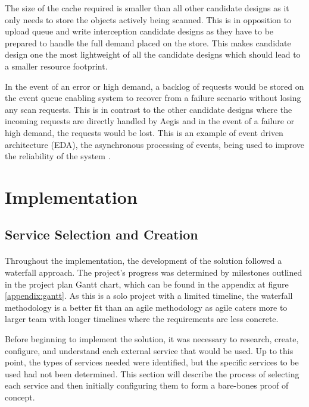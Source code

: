 \documentclass[12pt, conference, final, a4paper, onecolumn, compsoc]{IEEEtran}
\begin{document}
The size of the cache required is smaller than all other candidate designs as it
only needs to store the objects actively being scanned. This is in opposition to
upload queue and write interception candidate designs as they have to be
prepared to handle the full demand placed on the store. This makes candidate
design one the most lightweight of all the candidate designs which should lead
to a smaller resource footprint.

In the event of an error or high demand, a backlog of requests would be stored
on the event queue enabling system to recover from a failure scenario without
losing any scan requests. This is in contrast to the other candidate designs
where the incoming requests are directly handled by Aegis and in the event of a
failure or high demand, the requests would be lost. This is an example of event
driven architecture (EDA), the asynchronous processing of events, being used to improve the reliability of the system \citep{event-driven-arch}.

\section{Implementation}

\subsection{Service Selection and Creation}
\paragraph{}

Throughout the implementation, the development of the solution followed a
waterfall approach. The project's progress was determined by milestones outlined
in the project plan Gantt chart, which can be found in the appendix at figure
\ref{appendix:gantt}. As this is a solo project with a limited timeline, the
waterfall methodology is a better fit than an agile methodology as agile caters
more to larger team with longer timelines where the requirements are less
concrete.

Before beginning to implement the solution, it was necessary to research,
create, configure, and understand each external service that would be used. Up
to this point, the types of services needed were identified, but the specific
services to be used had not been determined. This section will describe the
process of selecting each service and then initially configuring them to form a
bare-bones proof of concept.
\end{document}
